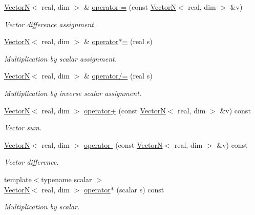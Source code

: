 \begin{DoxyCompactItemize}
\hyperlink{classVectorN}{VectorN}$<$ real, dim $>$ \& \hyperlink{classVectorN_a85e5e683a6f9aeff68b546ec923c737c}{operator-\/=} (const \hyperlink{classVectorN}{VectorN}$<$ real, dim $>$ \&v)
\begin{DoxyCompactList}\small\item\em Vector difference assignment. \end{DoxyCompactList}\item 
\hyperlink{classVectorN}{VectorN}$<$ real, dim $>$ \& \hyperlink{classVectorN_ab898c49e2188a964a637fdc749e9b26d}{operator$\ast$=} (real s)
\begin{DoxyCompactList}\small\item\em Multiplication by scalar assignment. \end{DoxyCompactList}\item 
\hyperlink{classVectorN}{VectorN}$<$ real, dim $>$ \& \hyperlink{classVectorN_a69839721f7fdf66ee896a91f98655274}{operator/=} (real s)
\begin{DoxyCompactList}\small\item\em Multiplication by inverse scalar assignment. \end{DoxyCompactList}\item 
\hyperlink{classVectorN}{VectorN}$<$ real, dim $>$ \hyperlink{classVectorN_a26e5f52c7b135d5d5c7775061e19647c}{operator+} (const \hyperlink{classVectorN}{VectorN}$<$ real, dim $>$ \&v) const 
\begin{DoxyCompactList}\small\item\em Vector sum. \end{DoxyCompactList}\item 
\hyperlink{classVectorN}{VectorN}$<$ real, dim $>$ \hyperlink{classVectorN_a6d4600d3a81bb8c486770771a38d6e30}{operator-\/} (const \hyperlink{classVectorN}{VectorN}$<$ real, dim $>$ \&v) const 
\begin{DoxyCompactList}\small\item\em Vector difference. \end{DoxyCompactList}\item 
{\footnotesize template$<$typename scalar $>$ }\\\hyperlink{classVectorN}{VectorN}$<$ real, dim $>$ \hyperlink{classVectorN_a829a2b55702c0fc475c3ae39d79b4e66}{operator$\ast$} (scalar s) const 
\begin{DoxyCompactList}\small\item\em Multiplication by scalar. \end{DoxyCompactList}\item 

\end{DoxyCompactItemize}
